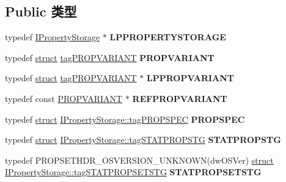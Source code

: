 \subsection*{Public 类型}
\begin{DoxyCompactItemize}
\item 
\mbox{\label{interface_i_property_storage_a24dce8ab7e49c3119763418ca98ee1f0}} 
typedef \hyperlink{interface_i_property_storage}{I\+Property\+Storage} $\ast$ {\bfseries L\+P\+P\+R\+O\+P\+E\+R\+T\+Y\+S\+T\+O\+R\+A\+GE}
\item 
\mbox{\label{interface_i_property_storage_a12c79ecb49eec87770c8e4a19a0e66a0}} 
typedef \hyperlink{interfacestruct}{struct} \hyperlink{struct_i_property_storage_1_1tag_p_r_o_p_v_a_r_i_a_n_t}{tag\+P\+R\+O\+P\+V\+A\+R\+I\+A\+NT} {\bfseries P\+R\+O\+P\+V\+A\+R\+I\+A\+NT}
\item 
\mbox{\label{interface_i_property_storage_a3b7467a1c922e98e1aa3f44f2dfc2530}} 
typedef \hyperlink{interfacestruct}{struct} \hyperlink{struct_i_property_storage_1_1tag_p_r_o_p_v_a_r_i_a_n_t}{tag\+P\+R\+O\+P\+V\+A\+R\+I\+A\+NT} $\ast$ {\bfseries L\+P\+P\+R\+O\+P\+V\+A\+R\+I\+A\+NT}
\item 
\mbox{\label{interface_i_property_storage_a1c6f3b33a9ba1e3559c492e4b0ea24a7}} 
typedef const \hyperlink{struct_i_property_storage_1_1tag_p_r_o_p_v_a_r_i_a_n_t}{P\+R\+O\+P\+V\+A\+R\+I\+A\+NT} $\ast$ {\bfseries R\+E\+F\+P\+R\+O\+P\+V\+A\+R\+I\+A\+NT}
\item 
\mbox{\label{interface_i_property_storage_afe3d71cbeed0f112c246e13df93d1b1e}} 
typedef \hyperlink{interfacestruct}{struct} \hyperlink{struct_i_property_storage_1_1tag_p_r_o_p_s_p_e_c}{I\+Property\+Storage\+::tag\+P\+R\+O\+P\+S\+P\+EC} {\bfseries P\+R\+O\+P\+S\+P\+EC}
\item 
\mbox{\label{interface_i_property_storage_a21c40bd7094ddd288f555322d937c8b6}} 
typedef \hyperlink{interfacestruct}{struct} \hyperlink{struct_i_property_storage_1_1tag_s_t_a_t_p_r_o_p_s_t_g}{I\+Property\+Storage\+::tag\+S\+T\+A\+T\+P\+R\+O\+P\+S\+TG} {\bfseries S\+T\+A\+T\+P\+R\+O\+P\+S\+TG}
\item 
\mbox{\label{interface_i_property_storage_aa0fdd0a8434d53ff1927672321bede43}} 
typedef P\+R\+O\+P\+S\+E\+T\+H\+D\+R\+\_\+\+O\+S\+V\+E\+R\+S\+I\+O\+N\+\_\+\+U\+N\+K\+N\+O\+WN(dw\+O\+S\+Ver) \hyperlink{interfacestruct}{struct} \hyperlink{struct_i_property_storage_1_1tag_s_t_a_t_p_r_o_p_s_e_t_s_t_g}{I\+Property\+Storage\+::tag\+S\+T\+A\+T\+P\+R\+O\+P\+S\+E\+T\+S\+TG} {\bfseries S\+T\+A\+T\+P\+R\+O\+P\+S\+E\+T\+S\+TG}
\end{DoxyCompactItemize}
